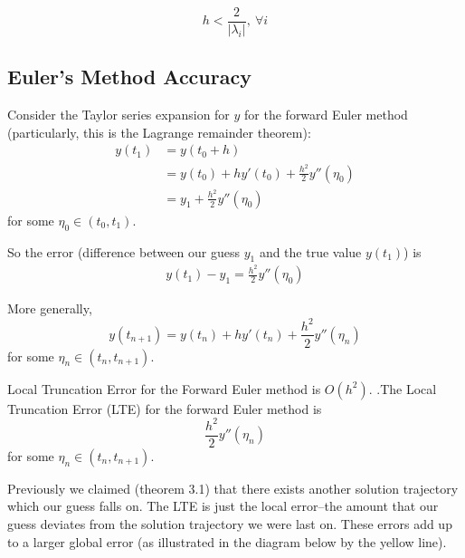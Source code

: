 \documentclass[12pt,letterpaper]{article}
\begin{document}
\begin{equation}
	h < \frac{2}{\lvert \lambda_i \rvert},\ \forall i
\end{equation}

\subsection{Euler's Method Accuracy}

Consider the Taylor series expansion for $y$ for the forward Euler method (particularly, this is the Lagrange remainder theorem):
\begin{align}
	y(t_1) &= y(t_0 + h) \\
	&= y(t_0) + hy'(t_0) + \frac{h^2}{2}y''(\eta_0) \\
	&= y_1 + \frac{h^2}{2}y''(\eta_0)
\end{align}
for some $\eta_0 \in (t_0, t_1)$.

So the error (difference between our guess $y_1$ and the true value $y(t_1)$) is
\begin{align}
	y(t_1) - y_1 = \frac{h^2}{2} y''(\eta_0)
\end{align}

More generally,
\begin{equation}
	y(t_{n+1}) = y(t_n) + hy'(t_n) + \frac{h^2}{2} y''(\eta_n)
\end{equation}
for some $\eta_n \in (t_n, t_{n+1})$.

\begin{theo}{Local Truncation Error for the Forward Euler method is $O(h^2)$.}
.The Local Truncation Error (LTE) for the forward Euler method is
\begin{equation}
	\frac{h^2}{2}y''(\eta_n)
\end{equation}
for some $\eta_n \in (t_n, t_{n+1})$.
\end{theo}

Previously we claimed (theorem 3.1) that there exists another solution trajectory which our guess falls on. The LTE is just the local error--the amount that our guess deviates from the solution trajectory we were last on. These errors add up to a larger global error (as illustrated in the diagram below by the yellow line).
\end{document}
